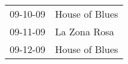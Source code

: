 \begin{supertabular}{p{0.25\columnwidth}p{0.75\columnwidth}}
 09-10-09 &  House of Blues \\
 09-11-09 &    La Zona Rosa \\
 09-12-09 &  House of Blues \\
\end{supertabular}
